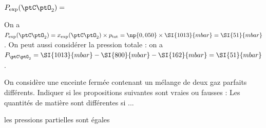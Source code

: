 \begin{enonce}
$P_\mathrm{exp}(\ptC\ptO_2)=$
\end{enonce}


\begin{corrigeNewpage}
On a $P_\mathrm{exp}(\ptC\ptO_2)=x_\mathrm{exp}(\ptC\ptO_2)\times p_\mathrm{tot}=\np{0,050} \times \SI{1013}{mbar} = \SI{51}{mbar}$. On peut aussi considérer la pression totale : on a $P_{\ptC\ptO_2} = \SI{1013}{mbar} - \SI{800}{mbar}-\SI{162}{mbar}=\SI{51}{mbar}$.  
\end{corrigeNewpage}


\finEntrainement





\newpage



\hauteurLargeurCadreReponse		{6mm}{12mm}
\initialisationEntrainement

On considère une enceinte fermée contenant un mélange de deux gaz parfaits différents. Indiquer si les propositions suivantes sont vraies ou fausses : \og{}Les quantités de matière sont différentes si ...

\debutEntrainement


\begin{enonce}
les pressions partielles sont égales\fg{}
\end{enonce}

